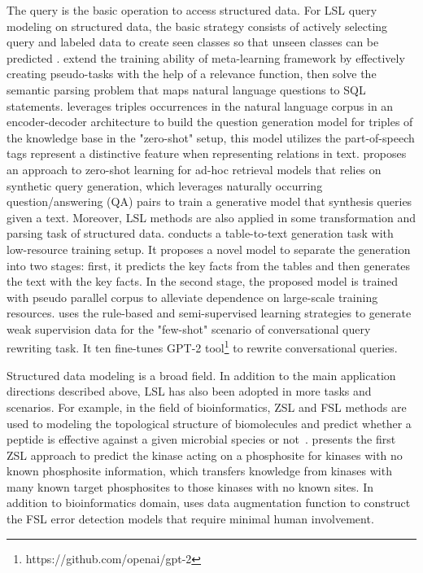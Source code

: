 \label{sec4.1.4}
The query is the basic operation to access structured data. For LSL query modeling on structured data, the basic strategy consists of actively selecting query and labeled data to create seen classes so that unseen classes can be predicted .  extend the training ability of meta-learning framework by effectively creating pseudo-tasks with the help of a relevance function, then solve the semantic parsing problem that maps natural language questions to SQL statements.  leverages triples occurrences in the natural language corpus in an encoder-decoder architecture to build the question generation model for triples of the knowledge base in the "zero-shot" setup, this model utilizes the part-of-speech tags represent a distinctive feature when representing relations in text.  proposes an approach to zero-shot learning for ad-hoc retrieval models that relies on synthetic query generation, which leverages naturally occurring question/answering (QA) pairs to train a generative model that synthesis queries given a text.
Moreover, LSL methods are also applied in some transformation and parsing task of structured data.  conducts a table-to-text generation task with low-resource training setup. It proposes a novel model to separate the generation into two stages: first, it predicts the key facts from the tables and then generates the text with the key facts. In the second stage, the proposed model is trained with pseudo parallel corpus to alleviate dependence on large-scale training resources.  uses the rule-based and semi-supervised learning strategies to generate weak supervision data for the "few-shot" scenario of conversational query rewriting task. It ten fine-tunes GPT-2 tool\footnote{https://github.com/openai/gpt-2} to rewrite conversational queries.

\label{sec4.1.5}
Structured data modeling is a broad field. In addition to the main application directions described above, LSL has also been adopted in more tasks and scenarios. For example, in the field of bioinformatics, ZSL and FSL methods are used to modeling the topological structure of biomolecules and predict whether a peptide is effective against a given microbial species or not~.  presents the first ZSL approach to predict the kinase acting on a phosphosite for kinases with no known phosphosite information, which transfers knowledge from kinases with many known target phosphosites to those kinases with no known sites. In addition to bioinformatics domain,  uses data augmentation function to construct the FSL error detection models that require minimal human involvement.

